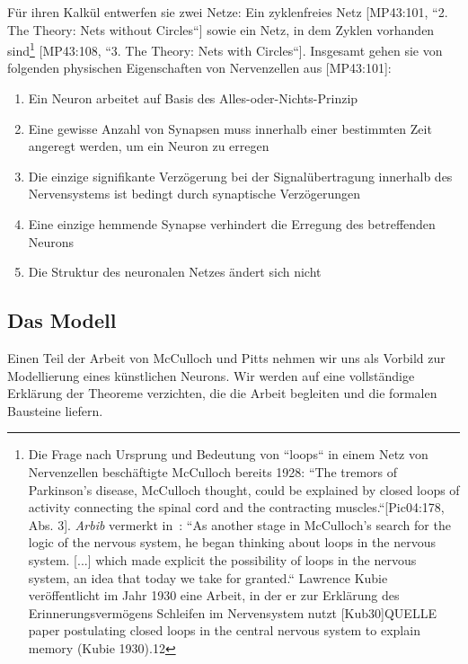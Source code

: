 Für ihren Kalkül entwerfen sie zwei Netze: Ein zyklenfreies Netz [MP43:101, ``2. The Theory: Nets without Circles``] sowie ein Netz, in dem Zyklen vorhanden sind\footnote{
    Die Frage nach Ursprung und Bedeutung von ``loops`` in einem Netz von Nervenzellen beschäftigte McCulloch bereits 1928: ``The tremors of Parkinson’s disease, McCulloch thought, could be explained by closed loops of activity connecting the spinal cord and the contracting muscles.``[Pic04:178, Abs. 3]. \textit{Arbib} vermerkt in~\cite[3]{Arb19}:  ``As another stage in McCulloch's search for the logic of the nervous system, he began thinking about loops in the nervous system. [...] which made explicit the possibility of loops in the nervous system, an idea that today we take for granted.`` Lawrence Kubie veröffentlicht im Jahr 1930 eine Arbeit, in der er zur Erklärung des Erinnerungsvermögens Schleifen im Nervensystem nutzt [Kub30]QUELLE
    paper postulating closed loops in the central nervous system to explain memory (Kubie 1930).12
} [MP43:108, ``3. The Theory: Nets with Circles``]. Insgesamt gehen sie von folgenden physischen Eigenschaften von Nervenzellen aus [MP43:101]:


\begin{enumerate}
    \item Ein Neuron arbeitet auf Basis des Alles-oder-Nichts-Prinzip
    \item Eine gewisse Anzahl von Synapsen muss innerhalb einer bestimmten Zeit angeregt werden, um ein Neuron zu erregen
    \item Die einzige signifikante Verzögerung bei der Signalübertragung innerhalb des Nervensystems ist bedingt durch synaptische Verzögerungen
    \item Eine einzige hemmende Synapse verhindert die Erregung des betreffenden Neurons
    \item Die Struktur des neuronalen Netzes ändert sich nicht
\end{enumerate}


\subsection{Das Modell}

Einen Teil der Arbeit von McCulloch und Pitts nehmen wir uns als Vorbild zur Modellierung eines künstlichen Neurons.
Wir werden auf eine vollständige Erklärung der Theoreme verzichten, die die Arbeit begleiten und die formalen Bausteine liefern.

